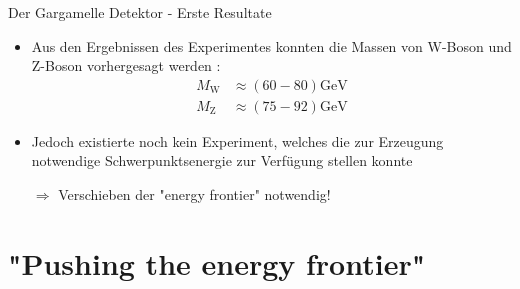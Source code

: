 \documentclass[aspectratio=1610, professionalfonts, 10pt]{beamer}
\begin{document}
\begin{frame}{Der Gargamelle Detektor - Erste Resultate}
		\begin{itemize}
			\setlength\itemsep{0.5em}
			\item Aus den Ergebnissen des Experimentes konnten die Massen von W-Boson und Z-Boson vorhergesagt werden \cite{doi:10.1142/9789814644150_0006}:
			\begin{align*}
				M_\text{W} &\approx \left(60-80\right)\si{\giga\electronvolt}\\
				M_\text{Z} &\approx \left(75-92\right)\si{\giga\electronvolt}
			\end{align*}
			\item Jedoch existierte noch kein Experiment, welches die zur Erzeugung notwendige Schwerpunktsenergie zur Verfügung stellen konnte
			\item[$\Rightarrow$]Verschieben der "energy frontier" notwendig!

		\end{itemize}
\end{frame}

\section{"Pushing the energy frontier"}
\end{document}
